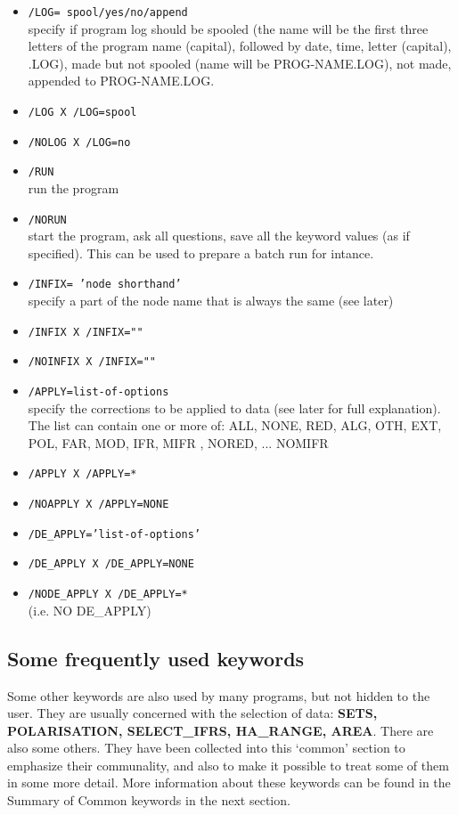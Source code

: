 \begin{itemize}
\item {\tt  /LOG= spool/yes/no/append}\\
	specify if program log should be
        spooled (the name will be the first
      	three letters of the program name
        (capital), followed by date, time,
        letter (capital), .LOG), made but not
        spooled (name will be PROG-NAME.LOG),
        not made, appended to PROG-NAME.LOG.
\item {\tt  /LOG X /LOG=spool}
\item {\tt  /NOLOG X /LOG=no}
\item {\tt  /RUN}\\				
	run the program
\item {\tt  /NORUN}\\				
	start the program, ask all questions,
        save all the keyword values (as if specified).
	This can be used to prepare a batch run for intance.
\item {\tt  /INFIX= 'node shorthand'}\\	
	specify a part of the node name that is always the same (see later)
\item {\tt  /INFIX X /INFIX=""}
\item {\tt  /NOINFIX X /INFIX=""}
\item {\tt  /APPLY=list-of-options}\\	
	specify the corrections to be applied to data (see later for full
        explanation). The list can contain one or more of:
	ALL, NONE, RED, ALG, OTH, EXT, POL,
        FAR, MOD, IFR, MIFR , NORED, ... NOMIFR
\item {\tt  /APPLY X /APPLY=*}\\
\item {\tt  /NOAPPLY X /APPLY=NONE}\\
\item {\tt  /DE\_APPLY='list-of-options'}\\
\item {\tt  /DE\_APPLY X /DE\_APPLY=NONE}\\
\item {\tt  /NODE\_APPLY X /DE\_APPLY=*}\\(i.e. NO DE\_APPLY)
\end{itemize}

\subsection{Some frequently used \NEWSTAR keywords}
\label{common.descr.NEWSTAR-other}

Some other keywords are also used by many \NEWSTAR programs,
but not hidden to the user.
They are usually concerned with the 
selection of data: {\bf SETS, POLARISATION, SELECT\_IFRS, HA\_RANGE,
AREA}. There are also some others. They have been collected into this
`common' section to emphasize their communality, and also to make it
possible to treat some of them in some more detail.
More information about these keywords can be found in the Summary of
Common keywords in the next section.
